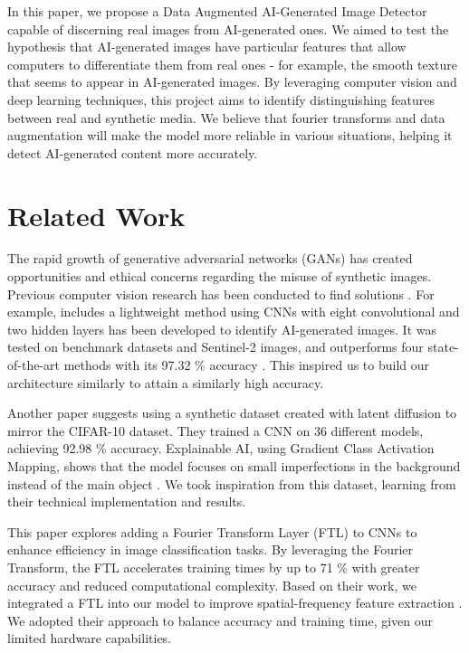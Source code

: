 In this paper, we propose a Data Augmented AI-Generated Image Detector capable of discerning real images from AI-generated ones. We aimed to test the hypothesis that AI-generated images have particular features that allow computers to differentiate them from real ones - for example, the smooth texture that seems to appear in AI-generated images. By leveraging computer vision and deep learning techniques, this project aims to identify distinguishing features between real and synthetic media. We believe that fourier transforms and data augmentation will make the model more reliable in various situations, helping it detect AI-generated content more accurately.


\section{Related Work}

The rapid growth of generative adversarial networks (GANs) has created opportunities and ethical concerns regarding the misuse of synthetic images. Previous computer vision research has been conducted to find solutions \cite{2, 3, 6}. For example, includes a lightweight method using CNNs with eight convolutional and two hidden layers has been developed to identify AI-generated images. It was tested on benchmark datasets and Sentinel-2 images, and outperforms four state-of-the-art methods with its 97.32 \% accuracy \cite{1}. This inspired us to build our architecture similarly to attain a similarly high accuracy.

Another paper suggests using a synthetic dataset created with latent diffusion to mirror the CIFAR-10 dataset. They trained a CNN on 36 different models, achieving 92.98 \% accuracy. Explainable AI, using Gradient Class Activation Mapping, shows that the model focuses on small imperfections in the background instead of the main object \cite{5}. We took inspiration from this dataset, learning from their technical implementation and results.

This paper explores adding a Fourier Transform Layer (FTL) to CNNs to enhance efficiency in image classification tasks. By leveraging the Fourier Transform, the FTL accelerates training times by up to 71 \% with greater accuracy and reduced computational complexity. Based on their work, we integrated a FTL into our model to improve spatial-frequency feature extraction \cite{4}. We adopted their approach to balance accuracy and training time, given our limited hardware capabilities.


